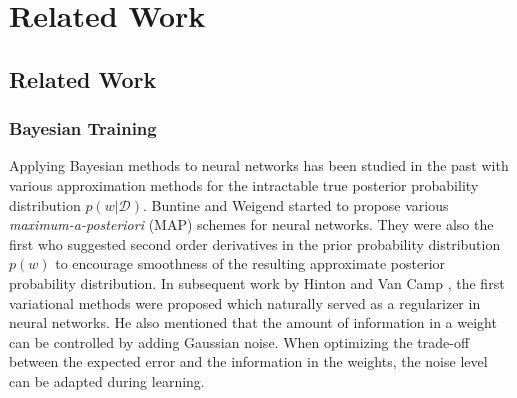 \chapter{Related Work}

\ifpdf
    \graphicspath{{Chapter3/Figs/Raster/}{Chapter3/Figs/PDF/}{Chapter3/Figs/}}
\else
    \graphicspath{{Chapter3/Figs/Vector/}{Chapter3/Figs/}}
\fi


\pagebreak

\section{Related Work}

\subsection{Bayesian Training}
Applying Bayesian methods to neural networks has been studied in the past with various approximation methods for the intractable true posterior probability distribution $p(w|\mathcal{D})$. Buntine and Weigend \cite{buntine1991bayesian} started to propose various \textit{maximum-a-posteriori} (MAP) schemes for neural networks. They were also the first who suggested second order derivatives in the prior probability distribution $p(w)$ to encourage smoothness of the resulting approximate posterior probability distribution.
In subsequent work by Hinton and Van Camp \cite{hinton1993keeping}, the first variational methods were proposed which naturally served as a regularizer in neural networks. He also mentioned that the amount of information in a weight can be controlled by adding Gaussian noise. When optimizing the trade-off between the expected error and the information in the weights, the noise level can be adapted during learning.



